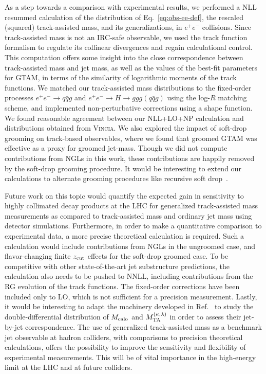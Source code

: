 \documentclass[letterpaper,11pt]{article}
\newcommand{\Ref}[1]{Ref.~\cite{#1}}
\newcommand{\Eq}[1]{Eq.~\eqref{#1}}
\begin{document}
As a step towards a comparison with experimental results, we performed a NLL resummed calculation of the distribution of \Eq{eq:obs-ee-def}, the rescaled (squared) track-assisted mass, and its generalizations, in $e^+e^-$ collisions. 
%
Since track-assisted mass is not an IRC-safe observable, we used the track function formalism to regulate its collinear divergences and regain calculational control. 
%
This computation offers some insight into the close correspondence between track-assisted mass and jet mass, as well as the values of the best-fit parameters for GTAM, in terms of the similarity of logarithmic moments of the track functions. 
%
We matched our track-assisted mass distributions to the fixed-order processes $e^+e^- \rightarrow q\bar{q}g$ and $e^+e^-\rightarrow H\rightarrow ggg(q\bar{q}g)$ using the log-$R$ matching scheme, and implemented non-perturbative corrections using a shape function.
%
We found reasonable agreement between our NLL+LO+NP calculation and distributions obtained from \textsc{Vincia}.
%
We also explored the impact of soft-drop grooming on track-based observables, where we found that groomed GTAM was effective as a proxy for groomed jet-mass.
%
Though we did not compute contributions from NGLs in this work, these contributions are happily removed by the soft-drop grooming procedure. 
%
It would be interesting to extend our calculations to alternate grooming procedures like recursive soft drop~\cite{Dreyer:2018tjj}. 


Future work on this topic would quantify the expected gain in sensitivity to highly collimated decay products at the LHC for generalized track-assisted mass measurements as compared to track-assisted mass and ordinary jet mass using detector simulations. 
%
Furthermore, in order to make a quantitative comparison to experimental data, a more precise theoretical calculation is required. 
%
Such a calculation would include contributions from NGLs in the ungroomed case, and flavor-changing finite $z_{\rm cut}$ effects for the soft-drop groomed case. 
%
To be competitive with other state-of-the-art jet substructure predictions, the calculation also needs to be pushed to NNLL, including contributions from the RG evolution of the track functions. 
%
The fixed-order corrections have been included only to LO, which is not sufficient for a precision measurement. 
%
Lastly, it would be interesting to adapt the machinery developed in \Ref{Larkoski:2014pca} to study the double-differential distribution of $M_{\rm calo}$ and $M_{\rm TA}^{(\kappa,\lambda)}$ in order to assess their jet-by-jet correspondence. 
%
The use of generalized track-assisted mass as a benchmark jet observable at hadron colliders, with comparisons to precision theoretical calculations, offers the possibility to improve the sensitivity and flexibility of experimental measurements. 
%
This will be of vital importance in the high-energy limit at the LHC and at future colliders. 
\end{document}
